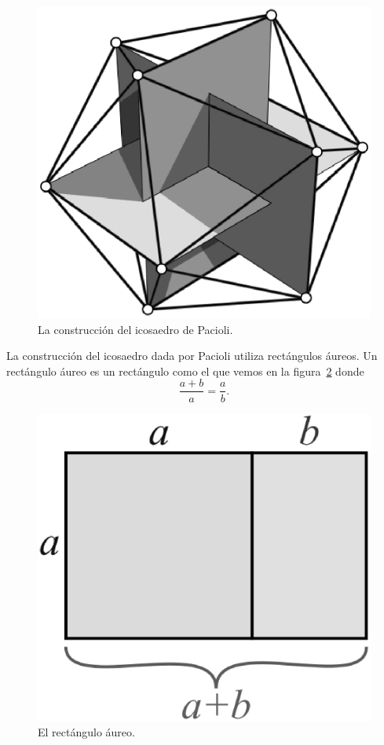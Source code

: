 \begin{figure}
   \centering
   \includegraphics[scale=0.3]{images/pacioli}
   \caption{La construcción del icosaedro de Pacioli.}
   \label{fig:Pacioli}
\end{figure}

La construcción del icosaedro dada por Pacioli utiliza rectángulos áureos. Un
rectángulo áureo es un rectángulo como el que vemos en la
figura~\ref{fig:golden} donde 
\[
	\frac{a+b}{a}=\frac{a}{b}.
\]

\begin{figure}
   \centering
   \includegraphics[scale=0.2]{images/golden}
   \caption{El rectángulo áureo.}
   \label{fig:golden}
\end{figure}

